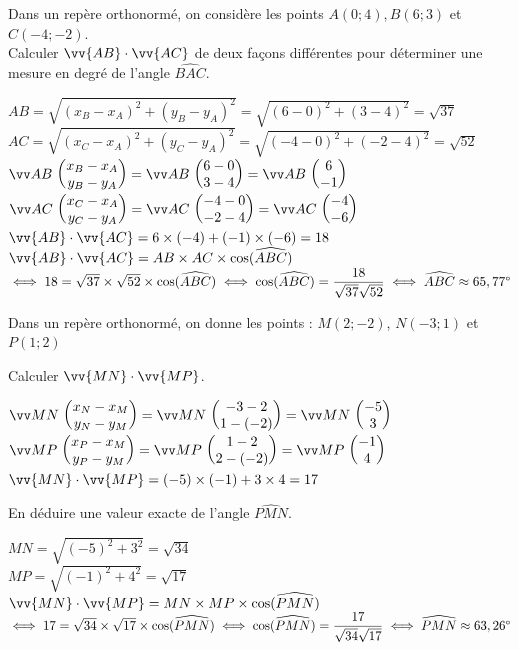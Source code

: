 \documentclass[11pt,a4paper]{article}  %
\begin{document}
\exercice{}
Dans un repère orthonormé, on considère les points $A(0 ; 4), B(6 ; 3)$ et $C(-4 ;-2)$.\\
Calculer $\vv{A B} \cdot \vv{A C}$ de deux façons différentes pour déterminer une mesure en degré de l'angle $\widehat{B A C}$.
\begin{corrBox}
	$AB=\sqrt{(x_B-x_A)^2+(y_B-y_A)^2}=\sqrt{(6-0)^2+(3-4)^2}=\sqrt{37}$\\
	$AC=\sqrt{(x_C-x_A)^2+(y_C-y_A)^2}=\sqrt{(-4-0)^2+(-2-4)^2}=\sqrt{52}$\\
	$\Coord{AB}{x_B-x_A}{y_B-y_A}=\Coord{AB}{6-0}{3-4}=\Coord{AB}{6}{-1}$\\
	$\Coord{AC}{x_C-x_A}{y_C-y_A}=\Coord{AC}{-4-0}{-2-4}=\Coord{AC}{-4}{-6}$\\
	$\vv{AB} \cdot \vv{AC}=6\times(-4)+(-1)\times(-6)=18$\\
	$\vv{AB} \cdot \vv{AC}=AB\times AC\times \cos(\widehat{ABC})$\\
	$\iff 18=\sqrt{37}\times\sqrt{52}\times\cos(\widehat{ABC})\iff \cos(\widehat{ABC})=\dfrac{18}{\sqrt{37}\sqrt{52}}\iff \widehat{ABC}\approx65,77\degree$
\end{corrBox}

\exercice{}
Dans un repère orthonormé, on donne les points : $M(2;-2)$, $N(-3;1)$ et $P(1;2)$
\begin{enumMet}
	\item Calculer $\vv{M N} \cdot \vv{M P}$.
	\begin{corrBox}
		$\Coord{MN}{x_N-x_M}{y_N-y_M}=\Coord{MN}{-3-2}{1-(-2)}=\Coord{MN}{-5}{3}$\\
		$\Coord{MP}{x_P-x_M}{y_P-y_M}=\Coord{MP}{1-2}{2-(-2)}=\Coord{MP}{-1}{4}$\\
		$\vv{MN} \cdot \vv{MP}=(-5)\times(-1)+3\times4=17$\\
	\end{corrBox}
	\item En déduire une valeur exacte de l'angle $\widehat{P M N}$.
	\begin{corrBox}
		$MN=\sqrt{(-5)^2+3^2}=\sqrt{34}$\\
		$MP=\sqrt{(-1)^2+4^2}=\sqrt{17}$\\
		$\vv{MN} \cdot \vv{MP}=MN\times MP\times \cos(\widehat{PMN})$\\
		$\iff 17=\sqrt{34}\times\sqrt{17}\times\cos(\widehat{PMN})\iff \cos(\widehat{PMN})=\dfrac{17}{\sqrt{34}\sqrt{17}}\iff \widehat{PMN}\approx63,26\degree$
	\end{corrBox}
\end{enumMet}
\end{document}

